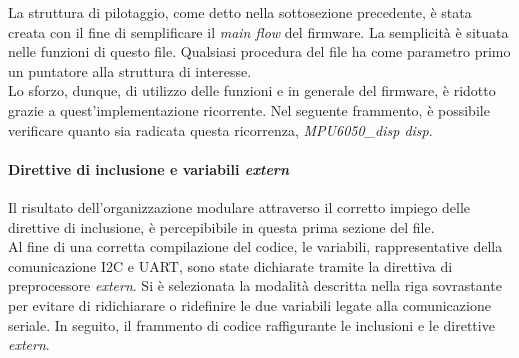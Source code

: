 La struttura di pilotaggio, come detto nella sottosezione precedente, è stata creata con il fine di semplificare il \textit{main flow} del firmware. La semplicità è situata nelle funzioni di questo file. Qualsiasi procedura del file ha come parametro primo un puntatore alla struttura di interesse.\\
Lo sforzo, dunque, di utilizzo delle funzioni e in generale del firmware, è ridotto grazie a quest'implementazione ricorrente.
Nel seguente frammento, è possibile verificare quanto sia radicata questa ricorrenza, \textit{MPU6050\_disp disp}.


\paragraph{Direttive di inclusione e variabili \textit{extern}}
Il risultato dell'organizzazione modulare attraverso il corretto impiego delle direttive di inclusione, è percepibibile in questa prima sezione del file.\\
Al fine di una corretta compilazione del codice, le variabili, rappresentative della comunicazione I2C e UART, sono state dichiarate tramite la direttiva di preprocessore \textit{extern}.
Si è selezionata la modalità descritta nella riga sovrastante per evitare di ridichiarare o ridefinire le due variabili legate alla comunicazione seriale.
In seguito, il frammento di codice raffigurante le inclusioni e le direttive \textit{extern}.





